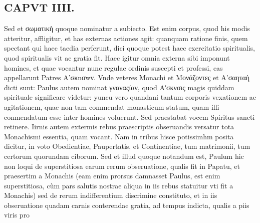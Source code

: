 \documentclass{article}
\begin{document}
\begin{pages}
\section*{CAPVT  IIII. }
\marginpar{[ p.209 ]}\pstart Sed et σωματικὴ quoque nominatur a subiecto. Est enim corpus, quod his modis atteritur, affligitur, et has externas actiones agit: quanquam ratione finis, quem spectant qui haec taedia perferunt, dici quoque potest haec exercitatio spiritualis, quod spiritualis vit ae gratia fit.  \pend\pstart Haec igitur omnia externa sibi imponunt homines, et quae vocantur nunc regulae ordinis suscepti et professi, eas appellarunt Patres A’σκnσwν. Vnde veteres Monachi et Μονάζοντες et Α’σαηταὴ dicti sunt: Paulus autem nominat γναναςίαν, quod Αʹσκνσις magis quiddam spirituale significare videtur: yuncu vero quandani tantum corporis vexationem ac agitationem, quae non tam commendat monasticum statum, quam illi conmendatum esse inter homines voluerunt. Sed praestabat vocem Spiritus sancti retinere.  \pend\pstart Iirnis autem extermis rebus praescriptis obseruandis versatur tota Monachismi essentia, quam vocant. Nam in tribus hisce potissimhm posita dicitur, in voto Obedientiae, Paupertatis, et Continentiae, tum matrimonii, tum certorum quorundam ciborum.  \pend\pstart Sed et illud quoque notandum est, Paulum hic non loqui de superstitiosa earum rerum obseruatione, qualis fit in Papatu, et praesertim a Monachis (eam enim prorsus damnasset Paulus, est enim superstitiosa, cùm pars salutis nostrae aliqua in iis rebus statuitur vti fit a Monachis) sed de rerum indifferentium discrimine constituto, et in iis obseruatione quadam carnis conterendae gratia, ad tempus indicta, qualis a piis viris pro  \pend

\end{pages}
\end{document}
